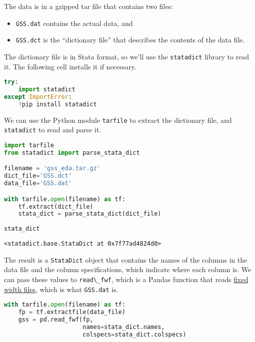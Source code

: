 The data is in a gzipped tar file that contains two files:

\begin{itemize}
\item
  \passthrough{\lstinline!GSS.dat!} contains the actual data, and
\item
  \passthrough{\lstinline!GSS.dct!} is the ``dictionary file'' that
  describes the contents of the data file.
\end{itemize}

The dictionary file is in Stata format, so we'll use the
\passthrough{\lstinline!statadict!} library to read it. The following
cell installs it if necessary.

\begin{lstlisting}[language=Python,style=source]
try:
    import statadict
except ImportError:
    !pip install statadict
\end{lstlisting}

We can use the Python module \passthrough{\lstinline!tarfile!} to
extract the dictionary file, and \passthrough{\lstinline!statadict!} to
read and parse it.

\begin{lstlisting}[language=Python,style=source]
import tarfile
from statadict import parse_stata_dict

filename = 'gss_eda.tar.gz'
dict_file='GSS.dct'
data_file='GSS.dat'

with tarfile.open(filename) as tf:
    tf.extract(dict_file)
    stata_dict = parse_stata_dict(dict_file)
        
stata_dict
\end{lstlisting}

\begin{lstlisting}[style=output]
<statadict.base.StataDict at 0x7f77ad4824d0>
\end{lstlisting}

The result is a \passthrough{\lstinline!StataDict!} object that contains
the names of the columns in the data file and the column specifications,
which indicate where each column is. We can pass these values to
\passthrough{\lstinline!read\_fwf!}, which is a Pandas function that
reads \href{https://en.wikipedia.org/wiki/Flat-file_database}{fixed
width files}, which is what \passthrough{\lstinline!GSS.dat!} is.

\begin{lstlisting}[language=Python,style=source]
with tarfile.open(filename) as tf:
    fp = tf.extractfile(data_file)  
    gss = pd.read_fwf(fp,
                      names=stata_dict.names,
                      colspecs=stata_dict.colspecs)
\end{lstlisting}

